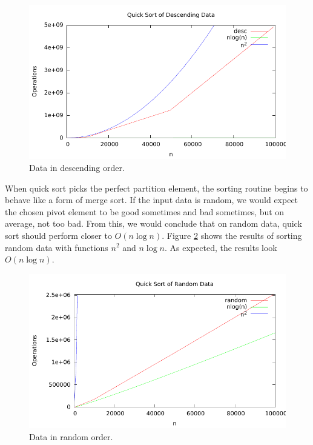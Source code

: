 \documentclass[twocolumn]{article}
\newcommand{\size}{.85}
\begin{document}
\begin{figure}[h]
 \centerline{\includegraphics[width=\size\columnwidth]{qsdesc}}
 \caption{Data in descending order.}\label{desc}
\end{figure}

When quick sort picks the perfect partition element, the sorting
routine begins to behave like a form of merge sort.  If the input data
is random, we would expect the chosen pivot element to be good
sometimes and bad sometimes, but on average, not too bad.  From this,
we would conclude that on random data, quick sort should perform
closer to $O(n\log n)$.  Figure \ref{random} shows the results of
sorting random data with functions $n^2$ and $n\log n$. As expected,
the results look $O(n\log n)$.

\begin{figure}[h]
 \centerline{\includegraphics[width=\size\columnwidth]{qsrandom}}
 \caption{Data in random order.}\label{random}
\end{figure}
\end{document}
